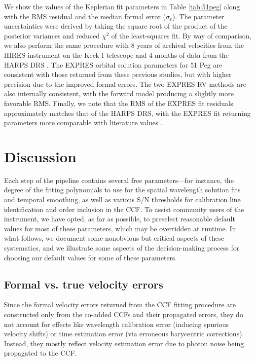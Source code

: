 We show the values of the Keplerian fit parameters in Table \ref{tab:51peg} along with the RMS residual and the median formal error ($\sigma_v$). The parameter uncertainties were derived by taking the square root of the product of the posterior variances and reduced $\chi^2$ of the least-squares fit. By way of comparison, we also perform the same procedure with 8 years of archival velocities from the HIRES instrument on the Keck I telescope \citep[corrected for instrumental systematics per][]{tal-or_correcting_2019} and 4 months of data from the HARPS DRS \citep{trifonov_public_2020}. The EXPRES orbital solution parameters for 51 Peg are consistent with those returned from these previous studies, but with higher precision due to the improved formal errors. The two EXPRES RV methods are also internally consistent, with the forward model producing a slightly more favorable RMS. Finally, we note that the RMS of the EXPRES fit residuals approximately matches that of the HARPS DRS, with the EXPRES fit returning parameters more comparable with literature values \citep{wang_eccentricity_2011, bedell_wobble_2019, wilson_first_2019}. 


\section{Discussion}
\label{pipeline:discussion}

Each step of the pipeline contains several free parameters---for instance, the degree of the fitting polynomials to use for the spatial wavelength solution fits and temporal smoothing, as well as various S/N thresholds for calibration line identification and order inclusion in the CCF.  To assist community users of the instrument, we have opted, as far as possible, to preselect reasonable default values for most of these parameters, which may be overridden at runtime. In what follows, we document some nonobvious but critical aspects of these systematics, and we illustrate some aspects of the decision-making process for choosing our default values for some of these parameters.

\subsection{Formal vs. true velocity errors}
\label{pipeline:formal-errors}

Since the formal velocity errors returned from the CCF fitting procedure are constructed only from the co-added CCFs and their propagated errors, they do not account for effects like wavelength calibration error (inducing spurious velocity shifts) or time estimation error (via erroneous barycentric corrections). Instead, they mostly reflect velocity estimation error due to photon noise being propagated to the CCF.

